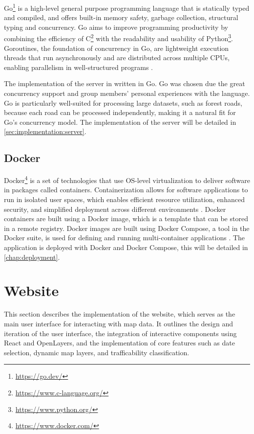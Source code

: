Go\footnote{\url{https://go.dev/}} is a high-level general purpose programming language that is statically typed and compiled, and offers built-in memory safety, garbage collection, structural typing and concurrency. Go aims to improve programming productivity by combining the efficiency of C\footnote{\url{https://www.c-language.org/}} with the readability and usability of Python\footnote{\url{https://www.python.org/}}. Goroutines, the foundation of concurrency in Go, are lightweight execution threads that run asynchronously and are distributed across multiple CPUs, enabling parallelism in well-structured programs \cite{goproglanguage}.

The implementation of the server in written in Go. Go was chosen due the great concurrency support and group members' personal experiences with the language. Go is particularly well-suited for processing large datasets, such as forest roads, because each road can be processed independently, making it a natural fit for Go’s concurrency model. The implementation of the server will be detailed in \autoref{sec:implementation:server}.

\subsection{Docker}\label{subsec:implementation:technologies:docker}

Docker\footnote{\url{https://www.docker.com/}} is a set of technologies that use OS-level virtualization to deliver software in packages called containers. Containerization allows for software applications to run in isolated user spaces, which enables efficient resource utilization, enhanced security, and simplified deployment across different environments \cite{containerizationwikipedia}\cite{dockerwikipedia}. Docker containers are built using a Docker image, which is a template that can be stored in a remote registry. Docker images are built using 
Docker Compose, a tool in the Docker suite, is used for defining and running multi-container applications \cite{dockercomposedocs}. The application is deployed with Docker and Docker Compose, this will be detailed in \autoref{chap:deployment}.

\section{Website}

This section describes the implementation of the website, which serves as the main user interface for interacting with map data. It outlines the design and iteration of the user interface, the integration of interactive components using React and OpenLayers, and the implementation of core features such as date selection, dynamic map layers, and trafficability classification.


